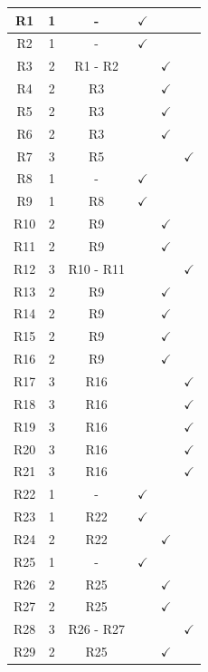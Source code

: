 \documentclass[12pt,a4paper,oneside]{article}
\begin{document}
\begin{longtable}[c]{|c|c|c|c|c|c|}
    R1 & 1 & - & $\checkmark$ & & \\
    \hline
    R2 & 1 & - & $\checkmark$ & & \\
    \hline
    R3 & 2 & R1 - R2 & & $\checkmark$ & \\
    \hline
    R4 & 2 & R3 & & $\checkmark$ & \\
    \hline
    R5 & 2 & R3 & & $\checkmark$ & \\
    \hline
    R6 & 2 & R3 & & $\checkmark$ & \\
    \hline
    R7 & 3 & R5 & & & $\checkmark$ \\
    \hline
    R8 & 1 & - & $\checkmark$ & & \\
    \hline
    R9 & 1 & R8 & $\checkmark$ & & \\
    \hline
    R10 & 2 & R9 & & $\checkmark$ & \\
    \hline
    R11 & 2 & R9 & & $\checkmark$ & \\
    \hline
    R12 & 3 & R10 - R11 & & & $\checkmark$ \\
    \hline
    R13 & 2 & R9 & & $\checkmark$ & \\
    \hline
    R14 & 2 & R9 & & $\checkmark$ & \\
    \hline
    R15 & 2 & R9 & & $\checkmark$ & \\
    \hline
    R16 & 2 & R9 & & $\checkmark$ & \\
    \hline
    R17 & 3 & R16 & & & $\checkmark$ \\
    \hline
    R18 & 3 & R16 & & & $\checkmark$ \\
    \hline
    R19 & 3 & R16 & & & $\checkmark$ \\
    \hline
    R20 & 3 & R16 & & & $\checkmark$ \\
    \hline
    R21 & 3 & R16 & & & $\checkmark$ \\
    \hline
    R22 & 1 & - & $\checkmark$ & & \\
    \hline
    R23 & 1 & R22 & $\checkmark$ & & \\
    \hline
    R24 & 2 & R22 & & $\checkmark$ & \\
    \hline
    R25 & 1 & - & $\checkmark$ & & \\
    \hline
    R26 & 2 & R25 & & $\checkmark$ & \\
    \hline
    R27 & 2 & R25 & & $\checkmark$ & \\
    \hline
    R28 & 3 & R26 - R27 & & & $\checkmark$ \\
    \hline
    R29 & 2 & R25 & & $\checkmark$ & \\

\end{longtable}
\end{document}
